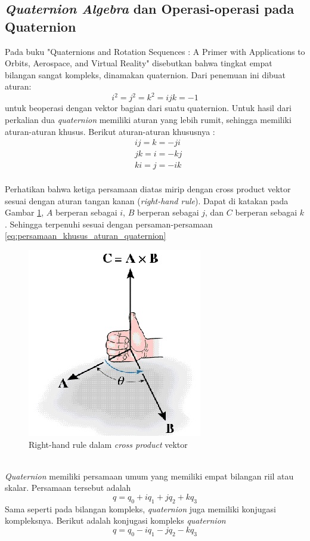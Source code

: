 \subsection{\textit{Quaternion Algebra} dan Operasi-operasi pada Quaternion}
\cite{kuipers:1999}Pada buku "Quaternions and Rotation Sequences : A Primer with Applications to Orbits, Aerospace, and Virtual Reality" disebutkan bahwa tingkat empat bilangan sangat kompleks, dinamakan quaternion. Dari penemuan ini dibuat aturan:
\[
	i^2 = j^2 = k^2 = ijk = -1
\]
untuk beoperasi dengan vektor bagian dari suatu quaternion.
Untuk hasil dari perkalian dua \textit{quaternion} memiliki aturan yang lebih rumit, sehingga memiliki aturan-aturan khusus. Berikut aturan-aturan khususnya :
\begin{equation}
	\begin{split}
	& ij = k = -ji\\
	& jk = i = -kj\\
	& ki = j = -ik	
	\end{split}
\label{eq:persamaan_khusus_aturan_quaternion}
\end{equation}\\
Perhatikan bahwa ketiga persamaan diatas mirip dengan cross product vektor sesuai dengan aturan tangan kanan (\textit{right-hand rule}). Dapat di katakan pada Gambar \ref{fig:right-hand-rule}, \(A\) berperan sebagai \(i\), \(B\) berperan sebagai \(j\), dan \(C\) berperan sebagai \(k\). Sehingga terpenuhi sesuai dengan persaman-persamaan \ref{eq:persamaan_khusus_aturan_quaternion}\\
\begin{figure}[htbp]
\centering
\includegraphics[scale=1]{Gambar/right-hand-rule}
\caption{Right-hand rule dalam \textit{cross product} vektor} 
\label{fig:right-hand-rule}
\end{figure}\\
\textit{Quaternion} memiliki persamaan umum yang memiliki empat bilangan riil atau skalar. Persamaan tersebut adalah 
\[
	q = q_0 + i q_1 + j q_2 + k q_3
\]\cite{kuipers:1999}
Sama seperti pada bilangan kompleks, \textit{quaternion} juga memiliki konjugasi kompleksnya. Berikut adalah konjugasi kompleks \textit{quaternion}
\[
	q = q_0 - i q_1 - j q_2 - k q_3
\]
